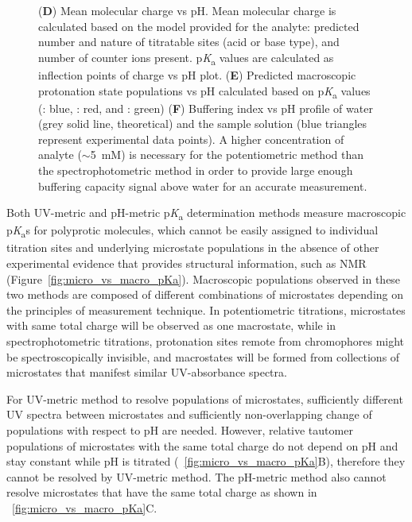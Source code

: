 \documentclass[9pt,lineno]{elife}
\newcommand{\pKa}{p\textit{K}\textsubscript{a}}
\begin{document}
\begin{figure}
{(\textbf{D}) Mean molecular charge vs pH. 
Mean molecular charge is calculated based on the model provided for the analyte: predicted number and nature of titratable sites (acid or base type), and number of counter ions present. 
\pKa{} values are calculated as inflection points of charge vs pH plot. 
(\textbf{E}) Predicted macroscopic protonation state populations vs pH calculated based on \pKa{} values (: blue, : red, and : green) 
(\textbf{F}) Buffering index vs pH profile of water (grey solid line, theoretical) and the sample solution (blue triangles represent experimental data points). 
A higher concentration of analyte ($\sim$5~mM) is necessary for the potentiometric method than the spectrophotometric method in order to provide large enough buffering capacity signal above water for an accurate measurement. 
}
\label{fig:UVmetric_vs_pHmetric_pKa}
\end{figure}

Both UV-metric and pH-metric \pKa{} determination methods measure macroscopic \pKa{}s for polyprotic molecules, which cannot be easily assigned to individual titration sites and underlying microstate populations in the absence of other experimental evidence that provides structural information, such as NMR (Figure~\ref{fig:micro_vs_macro_pKa}). 
Macroscopic populations observed in these two methods are composed of different combinations of microstates depending on the principles of measurement technique. 
In potentiometric titrations, microstates with same total charge will be observed as one macrostate, while in spectrophotometric titrations, protonation sites remote from chromophores might be spectroscopically invisible, and macrostates will be formed from collections of microstates that manifest similar UV-absorbance spectra.

For UV-metric method to resolve populations of microstates, sufficiently different UV spectra between microstates and sufficiently non-overlapping change of populations with respect to pH are needed. However, relative tautomer populations of microstates with the same total charge do not depend on pH and stay constant while pH is titrated (~\ref{fig:micro_vs_macro_pKa}B), therefore they cannot be resolved by UV-metric method. The pH-metric method also cannot resolve microstates that have the same total charge as shown in ~\ref{fig:micro_vs_macro_pKa}C.
\end{document}
